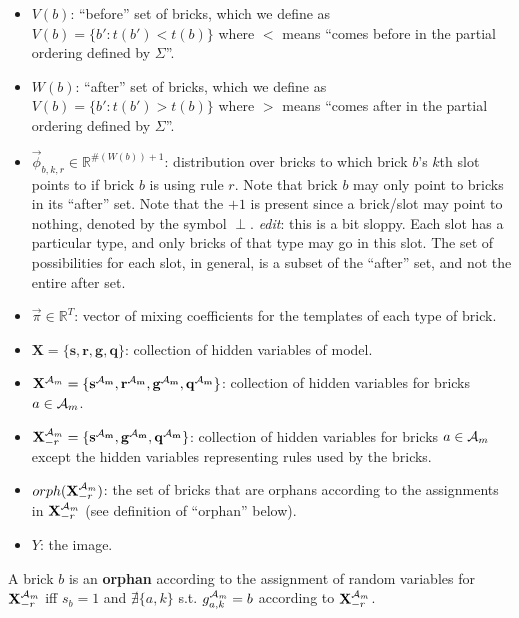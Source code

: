\documentclass[11pt]{article}
\newcommand{\A}{{\cal A}}
\newcommand{\X}{\mathbf{X}}
\newcommand{\symb}{\Sigma}
\newcommand{\Xrm}{\X^{\Am}_{-r}}
\newcommand{\Am}{\A_{m}}
\newcommand{\Real}{\mathbb{R}}
\newenvironment{definition}[1][Definition]{\begin{trivlist}
\item[\hskip \labelsep {\bfseries #1}]}{\end{trivlist}}
\begin{document}
\begin{itemize}
\item $V(b)$: ``before'' set of bricks, which we define as $V(b) = \{b' : t(b') < t(b) \}$ where $<$ means ``comes before in the partial ordering defined by $\symb$''.

\item $W(b)$: ``after'' set of bricks, which we define as $V(b) = \{b' : t(b') > t(b) \}$ where $>$ means ``comes after in the partial ordering defined by $\symb$''.

\item $\vec{\phi}_{b,k,r} \in \mathbb{R}^{\#(W(b))+1}$: distribution over bricks to which brick $b$'s $k$th slot points to if brick $b$ is using rule $r$. Note that brick $b$ may only point to bricks in its ``after'' set. Note that the $+1$ is present since a brick/slot may point to nothing, denoted by the symbol $\perp$. \emph{edit}: this is a bit sloppy. Each slot has a particular type, and only bricks of that type may go in this slot. The set of possibilities for each slot, in general, is a subset of the ``after'' set, and not the entire after set.

\item $\vec{\pi} \in \Real^T$: vector of mixing coefficients for the templates of each type of brick.

\item $\X = \{ \mathbf{s}, \mathbf{r}, \mathbf{g}, \mathbf{q}\}$: collection of hidden variables of model.

\item $\X^{\Am} = \{ \mathbf{s^{\Am}}, \mathbf{r^{\Am}}, \mathbf{g^{\Am}}, \mathbf{q^{\Am}} \}$: collection of hidden variables for bricks $a \in \Am$.

\item $\Xrm = \{ \mathbf{s^{\Am}}, \mathbf{g^{\Am}}, \mathbf{q^{\Am}} \}$: collection of hidden variables for bricks $a \in \Am$ except the hidden variables representing rules used by the bricks.

\item $orph(\Xrm)$: the set of bricks that are orphans according to the assignments in $\Xrm$ (see definition of ``orphan'' below).

\item $Y$: the image.

\end{itemize}

\begin{definition}
A brick $b$ is an \textbf{orphan} according to the assignment of random variables for $\Xrm$ iff $s_b=1$ and $\nexists \{a,k\}$ s.t. $g^{\Am}_{a,k} = b$ according to $\Xrm$.
\end{definition}
\end{document}
